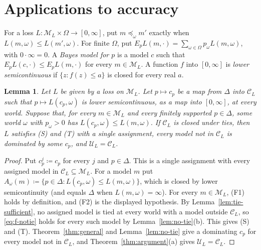 \documentclass[11pt]{article}
\newtheorem{lemma}[theorem]{Lemma}
\theoremstyle{definition}
\theoremstyle{remark}
\newcommand{\M}{\mathcal M}
\newcommand{\C}{\mathcal C}
\newcommand{\U}{\mathcal U}
\begin{document}
\section{Applications to accuracy}\label{sec:short-applications}
For a loss $L:\M_L\times\Omega\to[0,\infty]$, put $m\preceq_\omega m'$ exactly when $L(m,\omega)\le L(m',\omega)$. For finite $\Omega$, put $E_pL(m,\cdot)=\sum_{\omega\in\Omega}p_\omega L(m,\omega)$, with $0\cdot\infty=0$. A \emph{Bayes model for $p$} is a model $c$ such that $E_pL(c,\cdot)\le E_pL(m,\cdot)$ for every $m\in\M_L$. A function $f$ into $[0,\infty]$ is \emph{lower semicontinuous} if $\{z:f(z)\le a\}$ is closed for every real $a$.


\begin{lemma}\label{lem:loss-selection}
Let $L$ be given by a loss on $\M_L$. Let $p\mapsto c_p$ be a map from $\Delta$ into $\C_L$ such that $p\mapsto L(c_p,\omega)$ is lower semicontinuous, as a map into $[0,\infty]$, at every world. Suppose that, for every $m\in\M_L$ and every finitely supported $p\in\Delta$, some world $\omega$ with $p_\omega>0$ has $L(c_p,\omega)\le L(m,\omega)$. If $\C_L$ is closed under ties, then $L$ satisfies (S) and (T) with a single assignment, every model not in $\C_L$ is dominated by some $c_p$, and $\U_L=\C_L$.
\end{lemma}
\begin{proof}
Put $c^j_p\coloneqq c_p$ for every $j$ and $p\in\Delta$. This is a single assignment with every assigned model in $\C_L\subseteq\M_L$. For a model $m$ put $A_\omega(m)\coloneqq\{p\in\Delta:L(c_p,\omega)\le L(m,\omega)\}$, which is closed by lower semicontinuity (and equals $\Delta$ when $L(m,\omega)=\infty$). For every $m\in\M_L$, (F1) holds by definition, and (F2) is the displayed hypothesis. By Lemma~\ref{lem:tie-sufficient}, no assigned model is tied at every world with a model outside $\C_L$, so \eqref{eq:f-notie} holds for every such model by Lemma~\ref{lem:no-tie}(b). This gives (S) and (T). Theorem~\ref{thm:general} and Lemma~\ref{lem:no-tie} give a dominating $c_p$ for every model not in $\C_L$, and Theorem~\ref{thm:argument}(a) gives $\U_L=\C_L$.
\end{proof}
\end{document}
